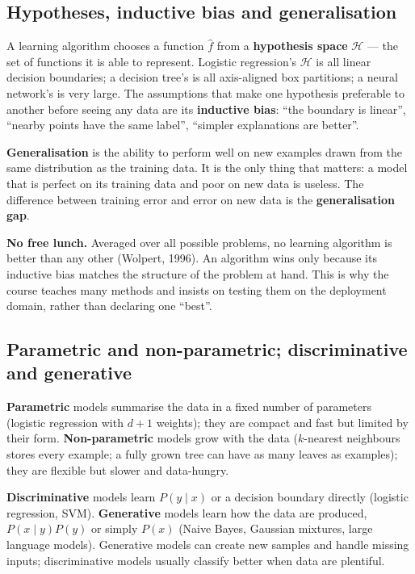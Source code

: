 \documentclass[11pt]{article}
\begin{document}
\subsection{Hypotheses, inductive bias and generalisation}
A learning algorithm chooses a function $\hat f$ from a \textbf{hypothesis space} $\mathcal H$ --- the set of functions it is able to represent. Logistic regression's $\mathcal H$ is all linear decision boundaries; a decision tree's is all axis-aligned box partitions; a neural network's is very large. The assumptions that make one hypothesis preferable to another before seeing any data are its \textbf{inductive bias}: ``the boundary is linear'', ``nearby points have the same label'', ``simpler explanations are better''.

\textbf{Generalisation} is the ability to perform well on new examples drawn from the same distribution as the training data. It is the only thing that matters: a model that is perfect on its training data and poor on new data is useless. The difference between training error and error on new data is the \textbf{generalisation gap}.

\begin{keypoint}\textbf{No free lunch.} Averaged over all possible problems, no learning algorithm is better than any other (Wolpert, 1996). An algorithm wins only because its inductive bias matches the structure of the problem at hand. This is why the course teaches many methods and insists on testing them on the deployment domain, rather than declaring one ``best''.\end{keypoint}

\subsection{Parametric and non-parametric; discriminative and generative}
\textbf{Parametric} models summarise the data in a fixed number of parameters (logistic regression with $d+1$ weights); they are compact and fast but limited by their form. \textbf{Non-parametric} models grow with the data ($k$-nearest neighbours stores every example; a fully grown tree can have as many leaves as examples); they are flexible but slower and data-hungry.

\textbf{Discriminative} models learn $P(y\mid x)$ or a decision boundary directly (logistic regression, SVM). \textbf{Generative} models learn how the data are produced, $P(x\mid y)P(y)$ or simply $P(x)$ (Naive Bayes, Gaussian mixtures, large language models). Generative models can create new samples and handle missing inputs; discriminative models usually classify better when data are plentiful.
\end{document}
